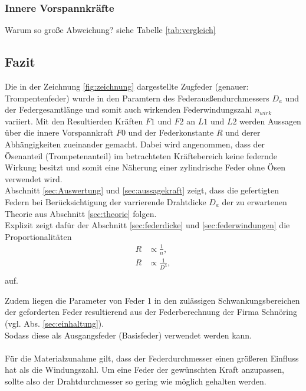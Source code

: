 \subsubsection{Innere Vorspannkräfte}
Warum so große Abweichung? siehe Tabelle \ref{tab:vergleich}

\subsection{Fazit}
Die in der Zeichnung \ref{fig:zeichnung} dargestellte Zugfeder (genauer: Trompentenfeder)
wurde in den Paramtern des Federausßendurchmessers $D_a$ und der Federgesamtlänge und somit auch
wirkenden Federwindungszahl $n_{wirk}$ variiert. Mit den Resultierden Kräften $F1$ und $F2$ an
$L1$ und $L2$ werden Aussagen über die innere Vorspannkraft $F0$ und der Federkonstante $R$ und derer
Abhängigkeiten zueinander gemacht. Dabei wird angenommen, dass der Ösenanteil (Trompetenanteil) 
im betrachteten Kräftebereich keine federnde Wirkung besitzt und somit eine Näherung einer
zylindrische Feder ohne Ösen verwendet wird.\\

Abschnitt \ref{sec:Auswertung} und \ref{sec:aussagekraft} zeigt, dass die gefertigten Federn 
bei Berücksichtigung der varrierende Drahtdicke $D_a$ der zu erwartenen 
Theorie aus Abschnitt \ref{sec:theorie} folgen.\\

Explizit zeigt dafür der Abschnitt \ref{sec:federdicke} und \ref{sec:federwindungen} die Proportionalitäten 
\begin{align*}
    R &\propto \frac{1}{n},\\
    R &\propto \frac{1}{D^3},\\
\end{align*}
auf.


Zudem liegen die Parameter von Feder 1 in den zulässigen Schwankungsbereichen 
der geforderten Feder resultierend aus der Federberechnung der Firma Schnöring (vgl. Abs. \ref{sec:einhaltung}).\\ 
Sodass diese als Ausgangsfeder (Basisfeder) verwendet werden kann.\\\\

Für die Materialzunahme gilt, dass der Federdurchmesser einen größeren Einfluss hat als die Windungszahl.
Um eine Feder der gewünschten Kraft anzupassen, sollte also der Drahtdurchmesser so gering wie möglich gehalten werden.









